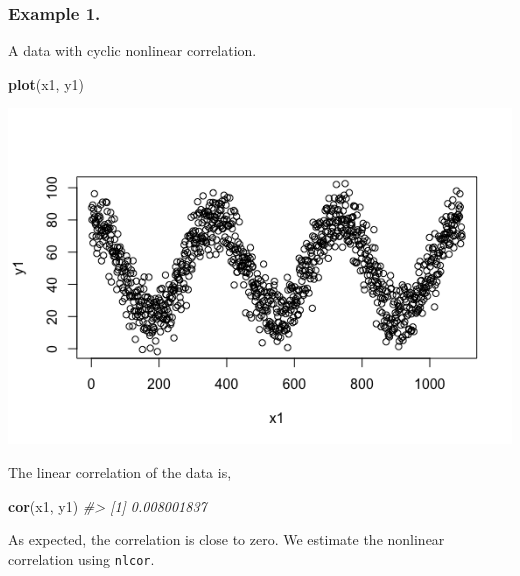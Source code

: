 \documentclass[]{article}
\newenvironment{Shaded}{\begin{snugshade}}{\end{snugshade}}
\newcommand{\CommentTok}[1]{\textcolor[rgb]{0.56,0.35,0.01}{\textit{#1}}}
\newcommand{\DataTypeTok}[1]{\textcolor[rgb]{0.13,0.29,0.53}{#1}}
\newcommand{\KeywordTok}[1]{\textcolor[rgb]{0.13,0.29,0.53}{\textbf{#1}}}
\newcommand{\NormalTok}[1]{#1}
\newcommand{\OperatorTok}[1]{\textcolor[rgb]{0.81,0.36,0.00}{\textbf{#1}}}
\newcommand{\StringTok}[1]{\textcolor[rgb]{0.31,0.60,0.02}{#1}}
\begin{document}
\hypertarget{example-1.}{%
\subsubsection{Example 1.}\label{example-1.}}

A data with cyclic nonlinear correlation.

\begin{Shaded}
\begin{Highlighting}[]
\KeywordTok{plot}\NormalTok{(x1, y1)}
\end{Highlighting}
\end{Shaded}

\begin{center}\includegraphics{README_files/figure-markdown_strict/Figure-1.1-1} \end{center}

The linear correlation of the data is,

\begin{Shaded}
\begin{Highlighting}[]
\KeywordTok{cor}\NormalTok{(x1, y1)}
\CommentTok{#> [1] 0.008001837}
\end{Highlighting}
\end{Shaded}

As expected, the correlation is close to zero. We estimate the nonlinear
correlation using \texttt{nlcor}.

\begin{Shaded}
\end{Shaded}
\end{document}
